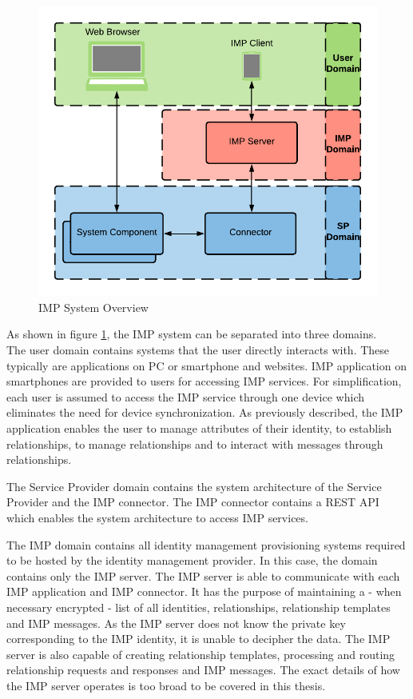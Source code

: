 \begin{figure}[h!]
    \centering
    \includegraphics[scale=0.6]{Diagrams/IMP System Overview.pdf}
    \caption{IMP System Overview}
    \label{imp:imp_system_overview}
\end{figure}

As shown in figure \ref{imp:imp_system_overview}, the IMP system can be separated into three domains. \\
The user domain contains systems that the user directly interacts with. These typically are applications on PC or smartphone and websites. IMP application on smartphones are provided to users for accessing IMP services. For simplification, each user is assumed to access the IMP service through one device which eliminates the need for device synchronization. As previously described, the IMP application enables the user to manage attributes of their identity, to establish relationships, to manage relationships and to interact with messages through relationships. 

The Service Provider domain contains the system architecture of the Service Provider and the IMP connector. The IMP connector contains a REST API which enables the system architecture to access IMP services.

The IMP domain contains all identity management provisioning systems required to be hosted by the identity management provider. In this case, the domain contains only the IMP server. The IMP server is able to communicate with each IMP application and IMP connector. It has the purpose of maintaining a - when necessary encrypted - list of all identities, relationships, relationship templates and IMP messages. As the IMP server does not know the private key corresponding to the IMP identity, it is unable to decipher the data. The IMP server is also capable of creating relationship templates, processing and routing relationship requests and responses and IMP messages. The exact details of how the IMP server operates is too broad to be covered in this thesis.

